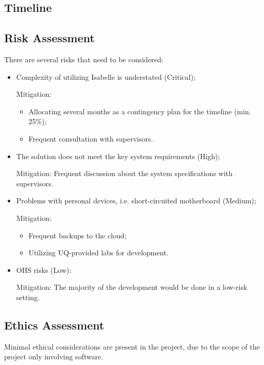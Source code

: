 \subsection{Timeline}
\lipsum[1-2]

\subsection{Risk Assessment}

There are several risks that need to be considered:
\begin{itemize}
    \item Complexity of utilizing Isabelle is understated (Critical);
    
          Mitigation:
          \begin{itemize}
            \item Allocating several months as a contingency plan for the timeline (min. 25\%);
            \item Frequent consultation with supervisors.
          \end{itemize}

    \item The solution does not meet the key system requirements (High);
    
          Mitigation: Frequent discussion about the system specifications with supervisors.

    \item Problems with personal devices, i.e. short-circuited motherboard (Medium);
    
          Mitigation:
          \begin{itemize}
            \item Frequent backups to the cloud;
            \item Utilizing UQ-provided labs for development.
          \end{itemize}

    \item OHS risks (Low):
    
          Mitigation: The majority of the development would be done in a low-risk setting.
\end{itemize}

\subsection{Ethics Assessment}

Minimal ethical considerations are present in the project, due to the scope of the project only involving 
software.